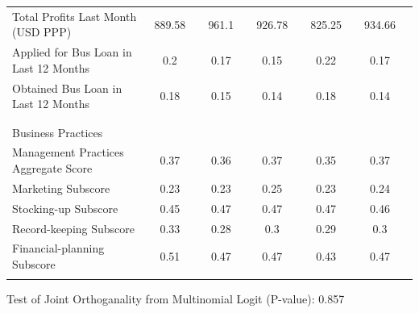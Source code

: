\documentclass[hideothersubsections, usenames,dvipsnames,10pt]{beamer}
\newenvironment{itemize_3pt}{\itemize\addtolength{\itemsep}{3pt}}{\enditemize}
\begin{document}
\begin{frame}
{{\begin{table}
\begin{tabular}{l*{10}{c}}
Total Profits Last Month (USD PPP)						& 889.58	&& 961.1 &&	926.78	&& 825.25	&& 934.66 \\
Applied for Bus Loan in Last 12 Months
			    & 0.2	&& 0.17	&& 0.15	&& 0.22	&& 0.17 \\
													
Obtained Bus Loan in Last 12 Months
						& 0.18 &&	0.15	&& 0.14	&& 0.18	&& 0.14 \\[0.5ex]
\\
\\
\textcolor{bdf}{Business Practices} \\
Management Practices Aggregate Score											& 0.37	&& 0.36	&& 0.37	&& 0.35	&& 0.37 \\
\hspace{3mm}Marketing Subscore												& 0.23	&& 0.23 &&	0.25	&& 0.23	&& 0.24 \\
\hspace{3mm}Stocking-up	Subscore											& 0.45	&& 0.47	&& 0.47	&& 0.47	&& 0.46 \\
\hspace{3mm}Record-keeping Subscore											& 0.33	&& 0.28	&& 0.3	&& 0.29 &&	0.3 \\
\hspace{3mm}Financial-planning Subscore									& 0.51	&& 0.47	&& 0.47	&& 0.43	&& 0.47 \\
&		&&		&&		&& \\
		\hline
		\hline
			\end{tabular}
		
		
	\end{table}}}
\begin{itemize_3pt}
\item Test of Joint Orthoganality from Multinomial Logit (P-value): 0.857
\end{itemize_3pt}
\end{frame}
\end{document}
